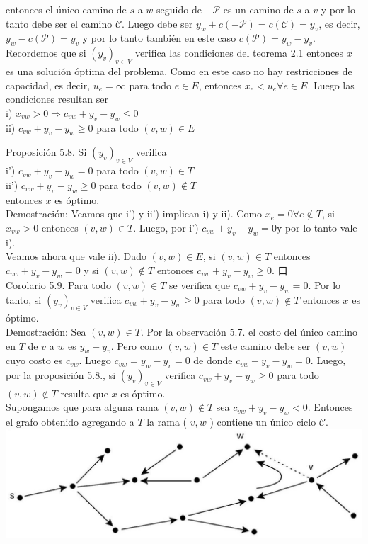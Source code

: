\documentclass[10pt]{article}
\begin{document}
entonces el único camino de $s$ a $w$ seguido de $-\mathcal{P}$ es un camino de $s$ a $v$ y por lo tanto debe ser el camino $\mathcal{C}$. Luego debe ser $y_{w}+c(-\mathcal{P})=c(\mathcal{C})=y_{v}$, es decir, $y_{w}-c(\mathcal{P})=y_{v}$ y por lo tanto también en este caso $c(\mathcal{P})=y_{w}-y_{v}$.\\
Recordemos que si $\left(y_{v}\right)_{v \in V}$ verifica las condiciones del teorema 2.1 entonces $x$ es una solución óptima del problema. Como en este caso no hay restricciones de capacidad, es decir, $u_{e}=\infty$ para todo $e \in E$, entonces $x_{e}<u_{e} \forall e \in E$. Luego las condiciones resultan ser\\
i) $x_{v w}>0 \Longrightarrow c_{v w}+y_{v}-y_{w} \leq 0$\\
ii) $c_{v w}+y_{v}-y_{w} \geq 0$ para todo $(v, w) \in E$

Proposición 5.8. Si $\left(y_{v}\right)_{v \in V}$ verifica\\
i') $c_{v w}+y_{v}-y_{w}=0$ para todo $(v, w) \in T$\\
ii') $c_{v w}+y_{v}-y_{w} \geq 0$ para todo $(v, w) \notin T$\\
entonces $x$ es óptimo.\\
Demostración: Veamos que i') y ii') implican i) y ii). Como $x_{e}=0 \forall e \notin T$, si $x_{v w}>0$ entonces $(v, w) \in T$. Luego, por i') $c_{v w}+y_{v}-y_{w}=0 \mathrm{y}$ por lo tanto vale i).\\
Veamos ahora que vale ii). Dado $(v, w) \in E$, si $(v, w) \in T$ entonces $c_{v w}+y_{v}-y_{w}=0$ y si $(v, w) \notin T$ entonces $c_{v w}+y_{v}-y_{w} \geq 0$. 口\\
Corolario 5.9. Para todo $(v, w) \in T$ se verifica que $c_{v w}+y_{v}-y_{w}=0$. Por lo tanto, si $\left(y_{v}\right)_{v \in V}$ verifica $c_{v w}+y_{v}-y_{w} \geq 0$ para todo $(v, w) \notin T$ entonces $x$ es óptimo.\\
Demostración: Sea $(v, w) \in T$. Por la observación 5.7. el costo del único camino en $T$ de $v$ a $w$ es $y_{w}-y_{v}$. Pero como $(v, w) \in T$ este camino debe ser $(v, w)$ cuyo costo es $c_{v w}$. Luego $c_{v w}=y_{w}-y_{v}=0$ de donde $c_{v w}+y_{v}-y_{w}=0$. Luego, por la proposición 5.8., si $\left(y_{v}\right)_{v \in V}$ verifica $c_{v w}+y_{v}-y_{w} \geq 0$ para todo $(v, w) \notin T$ resulta que $x$ es óptimo.\\
Supongamos que para alguna rama $(v, w) \notin T$ sea $c_{v w}+y_{v}-y_{w}<0$. Entonces el grafo obtenido agregando a $T$ la rama ( $v, w$ ) contiene un único ciclo $\mathcal{C}$.\\
\includegraphics[max width=\textwidth, center]{2025_09_05_955b52bfc43174a24a9ag-23(1)}
\end{document}
